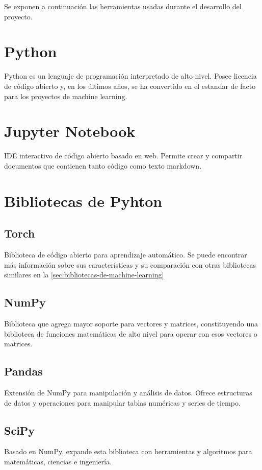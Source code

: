 
Se exponen a continuación las herramientas usadas durante el desarrollo del proyecto.

\section{Python}\label{sec:bibliotecas-de}
Python es un lenguaje de programación interpretado de alto nivel. Posee licencia de código abierto y, en los últimos años, se ha convertido en el estandar de facto para los proyectos de machine learning.

\section{Jupyter Notebook}
IDE interactivo de código abierto basado en web. Permite crear y compartir documentos que contienen tanto código como texto markdown.  

\section{Bibliotecas de Pyhton}

\subsection{Torch}
Biblioteca de código abierto para aprendizaje automático. Se puede encontrar más información sobre sus características y su comparación con otras bibliotecas similares en la \autoref{sec:bibliotecas-de-machine-learning} \\
 
\subsection{NumPy}
Biblioteca que agrega mayor soporte para vectores y matrices, constituyendo una biblioteca de funciones matemáticas de alto nivel para operar con esos vectores o matrices.

\subsection{Pandas}
Extensión de NumPy para manipulación y análisis de datos. Ofrece estructuras de datos y operaciones para manipular tablas numéricas y series de tiempo.

\subsection{SciPy}
Basado en NumPy, expande esta biblioteca con herramientas y algoritmos para matemáticas, ciencias e ingeniería. 

